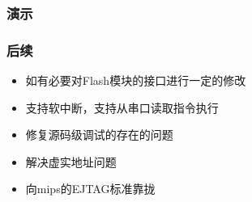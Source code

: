 ﻿\documentclass[11pt]{beamer}
\begin{document}
\begin{frame}
\frametitle{演示}
\end{frame}

\begin{frame}
\frametitle{后续}
\begin{itemize}
\item 如有必要对Flash模块的接口进行一定的修改
\item 支持软中断，支持从串口读取指令执行
\item 修复源码级调试的存在的问题
\item 解决虚实地址问题
\item 向mips的EJTAG标准靠拢
\end{itemize}
\end{frame}
\end{document}
